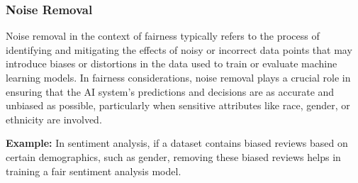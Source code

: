 \documentclass[12pt,a4paper,openright,twoside]{book}
\begin{document}
\subsubsection{Noise Removal}
Noise removal in the context of fairness typically refers to the process of identifying and mitigating the effects of noisy or incorrect data points that may introduce biases or distortions in the data used to train or evaluate machine learning models. In fairness considerations, noise removal plays a crucial role in ensuring that the AI system's predictions and decisions are as accurate and unbiased as possible, particularly when sensitive attributes like race, gender, or ethnicity are involved. \cite{NEURIPS2019_8d5e957f}

\textbf{Example:} In sentiment analysis, if a dataset contains biased reviews based on certain demographics, such as gender, removing these biased reviews helps in training a fair sentiment analysis model.
\end{document}
